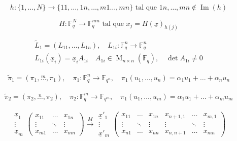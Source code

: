 \documentclass[12pt]{article}
\begin{document}
\[
h:\{1,\dots,N\}\longrightarrow
\{11,\dots,1n,\dots,m1\dots,mn\}
\text{ tal que }
1n,\dots,mn\notin\operatorname{Im}(h)
\]

\[
H:\mathbb{F}_q^N\longrightarrow
\mathbb{F}_q^{mn}
\text{ tal que }
x_j=H(\underline{x})_{h(j)}
\]

\begin{gather*}
\tilde{L}_1=(L_{11},\dots,L_{1n}),\quad L_{1i}:\mathbb{F}_q^{n}\to \mathbb{F}_q^{n}\\
L_{1i}(\underline{x}_i)=\underline{x}_i A_{1i}\quad
A_{1i}\in\operatorname{M}_{n\times n}(\mathbb{F}_q),\quad 
\det A_{1i}\neq 0
\end{gather*}

\begin{gather*}
\tilde{\pi}_1=(\pi_1,\overset{m}{\dots},\pi_1),\quad \pi_1:\mathbb{F}_q^{n}\to\mathbb{F}_{q^{n}},\quad
\pi_1(u_1,\dots,u_n)=\alpha_1 u_1+\dots+\alpha_n u_n
\end{gather*}

\begin{gather*}
\tilde{\pi}_2=(\pi_2,\overset{n}{\dots},\pi_2),\quad \pi_2:\mathbb{F}_q^{m}\to\mathbb{F}_{q^{m}},\quad
\pi_1(u_1,\dots,u_m)=\alpha_1 u_1+\dots+\alpha_m u_m
\end{gather*}

\[
\begin{matrix}
\underline{x}_1\\
\vdots\\
\underline{x}_m
\end{matrix}
\begin{pmatrix}
x_{11}&\dots&x_{1n}\\
\vdots&\ddots&\vdots\\
x_{m1}&\dots&x_{mn}
\end{pmatrix}
\overset{M}{\longrightarrow}
\begin{matrix}
\underline{x}'_1\\
\vdots\\
\underline{x}'_m
\end{matrix}
\begin{pmatrix}
x_{11}&\dots&x_{1n}&x_{n+1,1}&\dots&x_{m,1}\\
\vdots&\ddots&\vdots&\vdots&\ddots&\vdots\\
x_{n1}&\dots&x_{nn}&x_{n,n+1}&\dots&x_{mn}
\end{pmatrix}
\]
\end{document}
